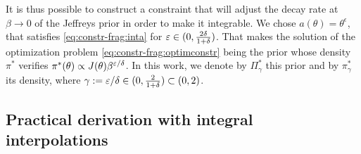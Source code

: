 It is thus possible to construct a constraint that will adjust the decay rate at $\beta\to0$ of the Jeffreys prior in order to make it integrable.
We chose $a(\theta)=\theta^\epsilon$, that satisfies \cref{eq:constr-frag:inta} for $\varepsilon\in(0,\frac{2\delta}{1+\delta})$. That makes the solution of the optimization problem \cref{eq:constr-frag:optimconstr} being the prior whose density $\pi^\ast$ verifies $\pi^\ast(\theta)\propto J(\theta)\beta^{\varepsilon/\delta}$. In this work, we denote by $\varPi^\ast_\gamma$ this prior and by $\pi^\ast_\gamma$ its density, where $\gamma:=\varepsilon/\delta\in(0,\frac{2}{1+\delta})\subset(0,2)$.













\subsection{Practical derivation with integral interpolations}


